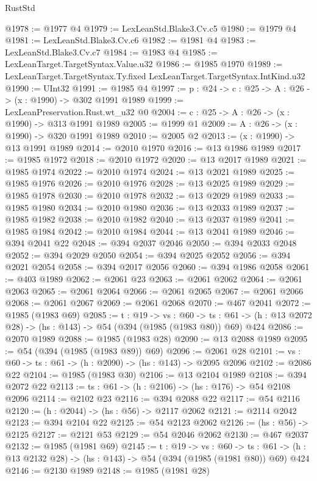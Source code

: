 \begin{lexlean}{RustStd}
\begin{coremodule}
{\begin{coremodule}
{{{{{{{{{{@1978 := @1977 @4
@1979 := LexLeanStd.Blake3.Cv.c5
@1980 := @1979 @4
@1981 := LexLeanStd.Blake3.Cv.c6
@1982 := @1981 @4
@1983 := LexLeanStd.Blake3.Cv.c7
@1984 := @1983 @4
@1985 := LexLeanTarget.TargetSyntax.Value.u32
@1986 := @1985 @1970
@1989 := LexLeanTarget.TargetSyntax.Ty.fixed LexLeanTarget.TargetSyntax.IntKind.u32
@1990 := UInt32
@1991 := @1985 @4
@1997 := {p : @24} -> {c : @25} -> {A : @26} -> (x : @1990) -> @302 @1991 @1989
@1999 := LexLeanPreservation.Rust.wt_u32 @0
@2004 := {c : @25} -> {A : @26} -> (x : @1990) -> @313 @1991 @1989
@2005 := @1999 @1
@2009 := {A : @26} -> (x : @1990) -> @320 @1991 @1989
@2010 := @2005 @2
@2013 := (x : @1990) -> @13 @1991 @1989
@2014 := @2010 @1970
@2016 := @13 @1986 @1989
@2017 := @1985 @1972
@2018 := @2010 @1972
@2020 := @13 @2017 @1989
@2021 := @1985 @1974
@2022 := @2010 @1974
@2024 := @13 @2021 @1989
@2025 := @1985 @1976
@2026 := @2010 @1976
@2028 := @13 @2025 @1989
@2029 := @1985 @1978
@2030 := @2010 @1978
@2032 := @13 @2029 @1989
@2033 := @1985 @1980
@2034 := @2010 @1980
@2036 := @13 @2033 @1989
@2037 := @1985 @1982
@2038 := @2010 @1982
@2040 := @13 @2037 @1989
@2041 := @1985 @1984
@2042 := @2010 @1984
@2044 := @13 @2041 @1989
@2046 := @394 @2041 @22
@2048 := @394 @2037 @2046
@2050 := @394 @2033 @2048
@2052 := @394 @2029 @2050
@2054 := @394 @2025 @2052
@2056 := @394 @2021 @2054
@2058 := @394 @2017 @2056
@2060 := @394 @1986 @2058
@2061 := @403 @1989
@2062 := @2061 @23
@2063 := @2061 @2062
@2064 := @2061 @2063
@2065 := @2061 @2064
@2066 := @2061 @2065
@2067 := @2061 @2066
@2068 := @2061 @2067
@2069 := @2061 @2068
@2070 := @467 @2041
@2072 := @1985 (@1983 @69)
@2085 := {t : @19} ->
  {vs : @60} ->
  {ts : @61} -> (h : @13 @2072 @28) -> (hs : @143) -> @54 (@394 (@1985 (@1983 @80)) @69) @424
@2086 := @2070 @1989
@2088 := @1985 (@1983 @28)
@2090 := @13 @2088 @1989
@2095 := @54 (@394 (@1985 (@1983 @89)) @69)
@2096 := @2061 @28
@2101 := {vs : @60} -> {ts : @61} -> (h : @2090) -> (hs : @143) -> @2095 @2096
@2102 := @2086 @22
@2104 := @1985 (@1983 @30)
@2106 := @13 @2104 @1989
@2108 := @394 @2072 @22
@2113 := {ts : @61} -> (h : @2106) -> (hs : @176) -> @54 @2108 @2096
@2114 := @2102 @23
@2116 := @394 @2088 @22
@2117 := @54 @2116
@2120 := (h : @2044) -> (hs : @56) -> @2117 @2062
@2121 := @2114 @2042
@2123 := @394 @2104 @22
@2125 := @54 @2123 @2062
@2126 := (hs : @56) -> @2125
@2127 := @2121 @53
@2129 := @54 @2046 @2062
@2130 := @467 @2037
@2132 := @1985 (@1981 @69)
@2145 := {t : @19} ->
  {vs : @60} ->
  {ts : @61} -> (h : @13 @2132 @28) -> (hs : @143) -> @54 (@394 (@1985 (@1981 @80)) @69) @424
@2146 := @2130 @1989
@2148 := @1985 (@1981 @28)
}}}}}}}}}}
\end{coremodule}}
\end{coremodule}
\end{lexlean}
